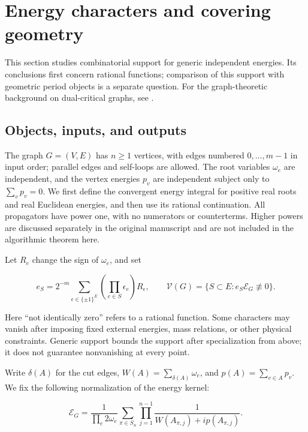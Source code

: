 \documentclass[11pt,a4paper,oneside]{article}
\theoremstyle{plain}
\theoremstyle{definition}
\theoremstyle{remark}
\numberwithin{equation}{section}
\begin{document}
\section{Energy characters and covering geometry}\label{ch:graph}

\begingroup

This section studies combinatorial support for generic independent energies. Its conclusions first concern rational functions; comparison of this support with geometric period objects is a separate question. For the graph-theoretic background on dual-critical graphs, see \cite{dualcritical}.

\subsection{Objects, inputs, and outputs}\label{sec:graph:1}

The graph \(G=(V,E)\) has \(n\geq1\) vertices, with edges numbered \(0,\ldots,m-1\) in input order; parallel edges and self-loops are allowed. The root variables \(\omega_e\) are independent, and the vertex energies \(p_v\) are independent subject only to \(\sum_vp_v=0\). We first define the convergent energy integral for positive real roots and real Euclidean energies, and then use its rational continuation. All propagators have power one, with no numerators or counterterms. Higher powers are discussed separately in the original manuscript and are not included in the algorithmic theorem here.

Let \(R_e\) change the sign of \(\omega_e\), and set

\begin{equation}
e_S=2^{-m}\sum_{\epsilon\in\{\pm1\}^{E}}
       \left(\prod_{e\in S}\epsilon_e\right)R_\epsilon,\qquad
 \mathcal V(G)=\{S\subset E:e_S\mathscr E_G\not\equiv0\}.
\end{equation}

Here ``not identically zero'' refers to a rational function. Some characters may vanish after imposing fixed external energies, mass relations, or other physical constraints. Generic support bounds the support after specialization from above; it does not guarantee nonvanishing at every point.

Write \(\delta(A)\) for the cut edges, \(W(A)=\sum_{\delta(A)}\omega_e\), and \(p(A)=\sum_{v\in A}p_v\). We fix the following normalization of the energy kernel:

\begin{equation}
\mathscr E_G=
 \frac1{\prod_e2\omega_e}
 \sum_{\pi\in S_n}\prod_{j=1}^{n-1}
 \frac1{W(A_{\pi,j})+ip(A_{\pi,j})}.                 \label{eq:graph:1}
\end{equation}
\end{document}
